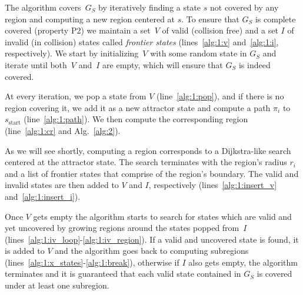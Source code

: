 \documentclass[letterpaper, 10 pt, conference]{ieeeconf}  %
\newcommand{\sStart}{\ensuremath{s_{\text{start}}\xspace}}
\begin{document}
The algorithm covers~$G_S$ by iteratively finding a state $s$ not covered by any region and computing a new region centered at $s$.
To ensure that $G_S$ is complete covered (property P2) we maintain a set~$V$ of valid (collision free) and a set $I$ of invalid (in collision) states called \emph{frontier states} (lines~\ref{alg:1:v} and~\ref{alg:1:i}, respectively).
We start by initializing~$V$ with some random state in $G_S$ and iterate until both~$V$ and~$I$ are empty, which will ensure that $G_S$ is indeed covered.

At every iteration, we pop a state from $V$ (line~\ref{alg:1:pop}), and if there is no region covering it, we add it as a new attractor state and compute a path $\pi_i$ to $\sStart$ (line~\ref{alg:1:path}).
We then compute the corresponding region (line~\ref{alg:1:cr} and Alg.~\ref{alg:2}).

As we will see shortly, computing a region corresponds to a Dijkstra-like search centered at the attractor state.
The search terminates with the region's radius $r_i$ and a list of frontier states that comprise of the region's boundary.
The valid and invalid states are then added to $V$ and $I$, respectively (lines~\ref{alg:1:insert_v} and~\ref{alg:1:insert_i}).


Once $V$ gets empty the algorithm starts to search for states which are valid and yet uncovered by growing regions around the states popped from~$I$ (lines~\ref{alg:1:iv_loop}-\ref{alg:1:iv_region}). If a valid and uncovered state is found, it is added to $V$ and the algorithm goes back to computing subregions (lines~\ref{alg:1:x_states}-\ref{alg:1:break}), otherwise if $I$ also gets empty, the algorithm terminates and it is guaranteed that each valid state contained in $G_S$ is covered under at least one subregion.

\end{document}
